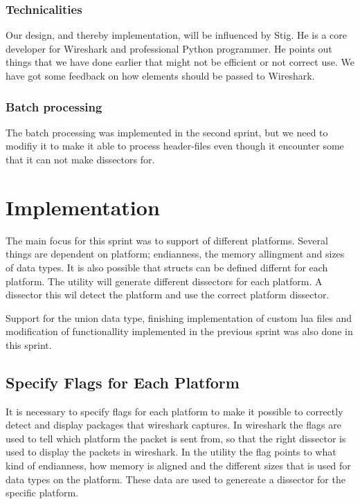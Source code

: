 \subsubsection{Technicalities}
Our design, and thereby implementation, will be influenced by Stig. He is a core developer for Wireshark and professional Python programmer. He points out things that we have done earlier that might not be efficient or not correct use. We have got some feedback on how elements should be passed to Wireshark.


\subsubsection{Batch processing}
The batch processing was implemented in the second sprint, but we need to modifiy it to make it able to process header-files even though it encounter some that it can not make dissectors for.


\section{Implementation}
The main focus for this sprint was to support of different platforms. Several 
things are dependent on platform; \gls{endianness}, the memory allingment and sizes 
of data types. It is also possible that structs can be defined differnt for 
each platform. The \gls{utility} will generate different \glspl{dissector} for each 
platform. A \gls{dissector} this wil detect the platform and use the correct 
platform \gls{dissector}.

Support for the \gls{union} data type, finishing implementation of custom \Gls{lua} files 
and modification of functionallity implemented in the previous sprint was also 
done in this sprint.

\subsection{Specify Flags for Each Platform}
It is necessary to specify flags for each platform to make it possible to 
correctly detect and display packages that wireshark captures. In wireshark 
the flags are used to tell which platform the \gls{packet} is sent from, so that 
the right \gls{dissector} is used to display the packets in \Gls{wireshark}. In the 
\gls{utility} the flag points to what kind of \gls{endianness}, how memory is aligned and 
the different sizes that is used for data types on the platform. These data 
are used to genereate a \gls{dissector} for the specific platform.

